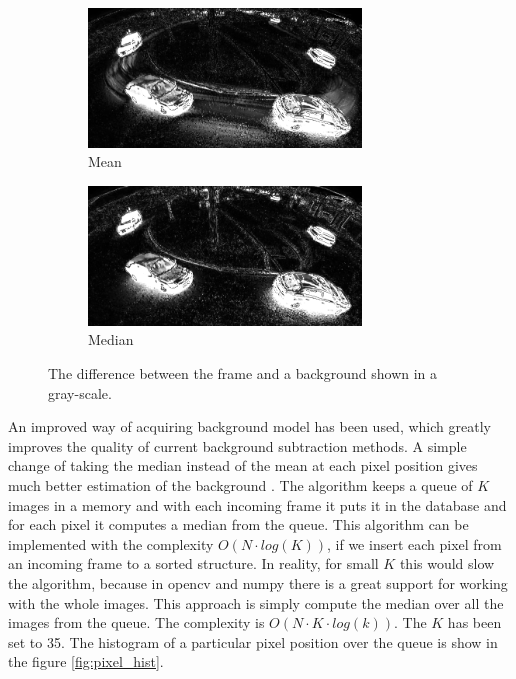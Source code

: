\documentclass[a4paper,12pt,titlepage, twoside]{article}
\numberwithin{figure}{section}
\begin{document}
\begin{figure}
    \begin{subfigure}[Sample1]{0.5\linewidth}
        \includegraphics[height=37mm]{fig/threshold_mean_crop.png}
        \caption{Mean}
        \label{fig:threshold_mean}
    \end{subfigure}
    \qquad
    \begin{subfigure}[Sample1]{0.5\linewidth}    
        \includegraphics[height=37mm]{fig/threshold_med_crop.png}
        \caption{Median}
        \label{fig:threshold_med}    
    \end{subfigure} 
    \caption{The difference between the frame and a background shown in a gray-scale.}
\end{figure}

An improved way of acquiring background model has been used, which greatly improves the quality of current background subtraction methods. A simple change of taking the median instead of the mean at each pixel position gives much better estimation of the background \cite{bgs-med1, bgs-med2}. The algorithm keeps a queue of $K$ images in a memory and with each incoming frame it puts it in the database and for each pixel it computes a median from the queue. This algorithm can be implemented with the complexity $O(N \cdot log(K))$, if we insert each pixel from an incoming frame to a sorted structure. In reality, for small $K$ this would slow the algorithm, because in opencv and numpy there is a great support for working with the whole images. This approach is simply compute the median over all the images from the queue. The complexity is $O(N \cdot K \cdot log(k)).$ The $K$ has been set to 35. The histogram of a particular pixel position over the queue is show in the figure \ref{fig:pixel_hist}.
\end{document}
